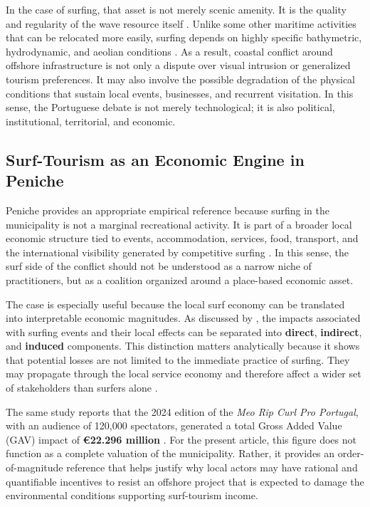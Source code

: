 \documentclass[final,times,authoryear]{elsarticle}
\begin{document}
In the case of surfing, that asset is not merely scenic amenity. It is the quality and regularity of the wave resource itself \citep{scarfe_surfing_review_2009,corne_surfing_development_2009,sewage_guidance_2009}. Unlike some other maritime activities that can be relocated more easily, surfing depends on highly specific bathymetric, hydrodynamic, and aeolian conditions \citep{scarfe_surfing_review_2009,corne_surfing_development_2009}. As a result, coastal conflict around offshore infrastructure is not only a dispute over visual intrusion or generalized tourism preferences. It may also involve the possible degradation of the physical conditions that sustain local events, businesses, and recurrent visitation. In this sense, the Portuguese debate is not merely technological; it is also political, institutional, territorial, and economic.

\subsection{Surf-Tourism as an Economic Engine in Peniche}

Peniche provides an appropriate empirical reference because surfing in the municipality is not a marginal recreational activity. It is part of a broader local economic structure tied to events, accommodation, services, food, transport, and the international visibility generated by competitive surfing \citep{visit_portugal_peniche,cm_peniche_wct_impact_2016,gonzalez_peniche_2025,melo_wsl_economy_impact2025}. In this sense, the surf side of the conflict should not be understood as a narrow niche of practitioners, but as a coalition organized around a place-based economic asset.

The case is especially useful because the local surf economy can be translated into interpretable economic magnitudes. As discussed by \citep{melo_wsl_economy_impact2025}, the impacts associated with surfing events and their local effects can be separated into \textbf{direct}, \textbf{indirect}, and \textbf{induced} components. This distinction matters analytically because it shows that potential losses are not limited to the immediate practice of surfing. They may propagate through the local service economy and therefore affect a wider set of stakeholders than surfers alone \citep{cm_peniche_surf_sustainability_2017,gonzalez_peniche_2025}.

The same study reports that the 2024 edition of the \textit{Meo Rip Curl Pro Portugal}, with an audience of 120,000 spectators, generated a total Gross Added Value (GAV) impact of \textbf{€22.296 million} \citep{melo_wsl_economy_impact2025}. For the present article, this figure does not function as a complete valuation of the municipality. Rather, it provides an order-of-magnitude reference that helps justify why local actors may have rational and quantifiable incentives to resist an offshore project that is expected to damage the environmental conditions supporting surf-tourism income.
\end{document}
